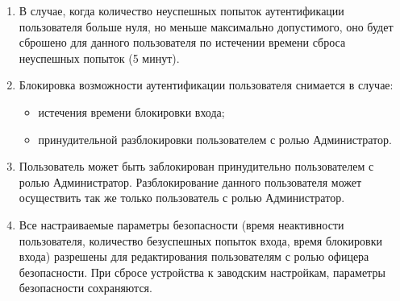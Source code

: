 \begin{enumerate}[label=\arabic{section}.\arabic{subsection}.\arabic*, labelsep=4pt, leftmargin=0pt, itemindent=57pt]
\begin{enumerate}[label=\arabic{section}.\arabic{subsection}.\arabic{enumi}.\arabic*, labelsep=4pt, leftmargin=0em, itemindent=65pt, parsep=0pt]
\item
В случае, когда количество неуспешных попыток аутентификации пользователя больше нуля, но меньше максимально допустимого, оно будет сброшено для данного пользователя по истечении времени сброса неуспешных попыток (5 минут).

\item
Блокировка возможности аутентификации пользователя снимается в случае:
\begin{itemize}
    \item истечения времени блокировки входа;
    \item принудительной разблокировки пользователем с ролью Администратор. 
\end{itemize}

\item
Пользователь может быть заблокирован принудительно пользователем с ролью Администратор. Разблокирование данного пользователя может осуществить так же только пользователь с ролью Администратор.

\item
Все настраиваемые параметры безопасности (время неактивности пользователя, количество безуспешных попыток входа, время блокировки входа) разрешены для редактирования пользователям с ролью офицера безопасности. При сбросе устройства к заводским настройкам, параметры безопасности сохраняются.




\end{enumerate}
\end{enumerate}
